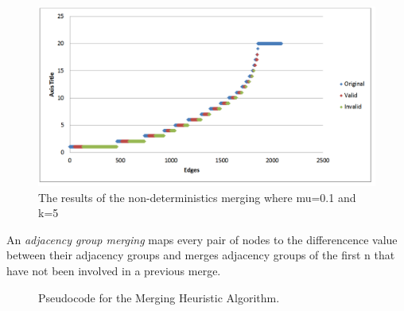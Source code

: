 \begin{figure}[htb]
  \label{merge_k_5}
  \centering
  \includegraphics[scale=0.4]{mu=0_1 k=5 non-det merge 5.png}
  \caption{The results of the non-deterministics merging where mu=0.1 and k=5}
  \label{fig:merge_k_5}
\end{figure}

\begin{definition}
An \emph{adjacency group merging} maps every pair of nodes to  the differencence value between their adjacency groups and merges adjacency groups of the first n that have not been involved in a previous merge.
\end{definition}

\begin{figure}[htb]
	\begin{algorithmic}
		\renewcommand{\algorithmicrequire}{\textbf{Input:}}
		\renewcommand{\algorithmicensure}{\textbf{Output:}}
			\EndFor
		\EndFor
		\EndFor
			\EndIf
		\EndIf
	\end{algorithmic}
	\caption{Pseudocode for the Merging Heuristic Algorithm.}
	\label{fig:merging}
\end{figure}
